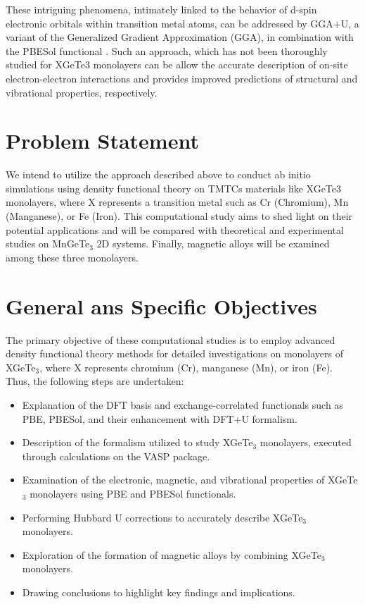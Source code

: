 These intriguing phenomena, intimately linked to the behavior of d-spin electronic orbitals within transition metal atoms, can be addressed by GGA$+$U\supercite{Anisimov1991}, a variant of the Generalized Gradient Approximation (GGA), in combination with the PBESol functional \supercite{Perdew2008}.  Such an approach,  which has not been thoroughly studied for XGeTe3 monolayers can be allow the accurate description of on-site electron-electron interactions and provides improved predictions of structural and vibrational properties, respectively.

\section{Problem Statement}

\label{section.problem_statement}

We intend to utilize the approach described above to conduct ab initio simulations using density functional theory on TMTCs materials like XGeTe3 monolayers, where X represents a transition metal such as Cr (Chromium), Mn (Manganese), or Fe (Iron). This computational study aims to shed light on their potential applications and will be compared with theoretical and experimental studies on MnGeTe$_3$\supercite{Chittari2020,Song2023,Hao2021} 2D systems. Finally, magnetic alloys will be examined among these three monolayers.


\section{General ans Specific Objectives}

\label{section.general_specific_objectives}
The primary objective of these computational studies is to employ advanced density functional theory methods for detailed investigations on monolayers of XGeTe$_3$, where X represents chromium (Cr), manganese (Mn), or iron (Fe). Thus, the following steps are undertaken:

\begin{itemize}
    \item Explanation of the DFT basis and exchange-correlated functionals such as PBE, PBESol, and their enhancement with DFT$+$U formalism.
    \item Description of the formalism utilized to study XGeTe$_3$ monolayers, executed through calculations on the VASP package.
    \item Examination of the electronic, magnetic, and vibrational properties of XGeTe$_3$ monolayers using PBE and PBESol functionals.
    \item Performing Hubbard U corrections to accurately describe XGeTe$_3$ monolayers.
    \item Exploration of the formation of magnetic alloys by combining XGeTe$_3$ monolayers.
    \item Drawing conclusions to highlight key findings and implications.
\end{itemize}

